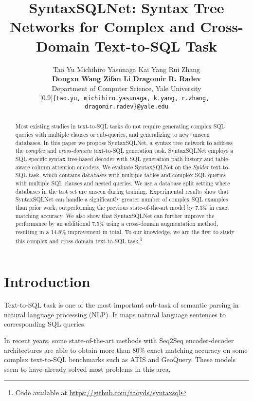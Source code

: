 \documentclass[11pt,a4paper]{article}
\title{SyntaxSQLNet: Syntax Tree Networks for Complex and Cross-Domain Text-to-SQL Task
}
\author{Tao Yu \quad Michihiro Yasunaga \quad Kai Yang \quad Rui Zhang   \\{\bf Dongxu Wang \quad Zifan Li \quad Dragomir R. Radev}\\
Department of Computer Science, Yale University\\
\scalebox{0.87}[0.9]{{\tt \{tao.yu,\,michihiro.yasunaga,\,k.yang,\,r.zhang,\,dragomir.radev\}@yale.edu}}}
\date{}
\begin{document}
\setlength{\abovedisplayskip}{4pt}
\setlength{\belowdisplayskip}{4pt}


\maketitle
\begin{abstract}

Most existing studies in text-to-SQL tasks do not require generating complex SQL queries with multiple clauses or sub-queries, and generalizing to new, unseen databases.
In this paper we propose SyntaxSQLNet, a syntax tree network to address the \textit{complex} and \textit{cross-domain} text-to-SQL generation task.
SyntaxSQLNet employs a SQL specific syntax tree-based decoder with SQL generation path history and table-aware column attention encoders.
We evaluate SyntaxSQLNet on the \textit{Spider} text-to-SQL task, which contains databases with multiple tables and complex SQL queries with multiple SQL clauses and nested queries.
We use a database split setting where databases in the test set are unseen during training.
Experimental results show that SyntaxSQLNet can handle a significantly greater number of complex SQL examples than prior work, outperforming the previous state-of-the-art model by 7.3\% in exact matching accuracy.
We also show that SyntaxSQLNet can further improve the performance by an additional 7.5\% using a cross-domain augmentation method, resulting in a 14.8\% improvement in total.
To our knowledge, we are the first to study this complex and cross-domain text-to-SQL task.\footnote{Code available at
\href{https://github.com/taoyds/syntaxsql}{https://github.com/taoyds/syntaxsql}}






\end{abstract}

\section{Introduction}

Text-to-SQL task is one of the most important sub-task of semantic parsing in natural language processing (NLP). It maps natural language sentences to corresponding SQL queries.

In recent years, some state-of-the-art methods with Seq2Seq encoder-decoder architectures are able to obtain more than 80\% exact matching accuracy on some complex text-to-SQL benchmarks such as ATIS and GeoQuery. These models seem to have already solved most problems in this area.
\end{document}

